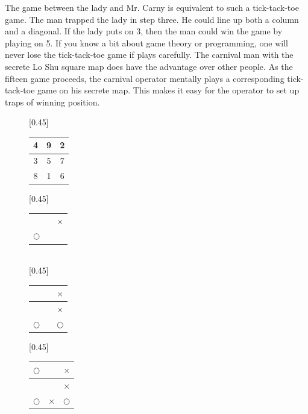\documentclass[UTF8]{article}
\begin{document}
The game between the lady and Mr. Carny is equivalent to such a tick-tack-toe game. The man trapped the lady in step three. He could line up both a column and a diagonal. If the lady puts on 3, then the man could win the game by playing on 5. If you know a bit about game theory or programming, one will never lose the tick-tack-toe game if plays carefully. The carnival man with the secrete Lo Shu square map does have the advantage over other people. As the fifteen game proceeds, the carnival operator mentally plays a corresponding tick-tack-toe game on his secrete map. This makes it easy for the operator to set up traps of winning position.

\begin{figure}[htbp]
 \centering
 [0.45\linewidth]{
   \begin{tabular}{|c|c|c|}
   \hline
   4 & 9 & 2 \\
   \hline
   3 & 5 & 7 \\
   \hline
   8 & 1 & 6 \\
   \hline
   \end{tabular}
   \vspace{3mm}
 }
 [0.45\linewidth]{
   \begin{tabular}{c|c|c}
   &  & \\
   \hline
   &  & $\times$ \\
   \hline
   $\bigcirc$ & & \\
   \end{tabular}
   \vspace{3mm}
 } \vspace{3mm} \\
 [0.45\linewidth]{
   \begin{tabular}{c|c|c}
   &  & $\times$\\
   \hline
   &  & $\times$ \\
   \hline
   $\bigcirc$ & & $\bigcirc$ \\
   \end{tabular}
   \vspace{3mm}
 }
 [0.45\linewidth]{
   \begin{tabular}{c|c|c}
   $\bigcirc$ &  & $\times$\\
   \hline
   &  & $\times$ \\
   \hline
   $\bigcirc$ & $\times$ & $\bigcirc$ \\

\end{tabular}}
\end{figure}
\end{document}
